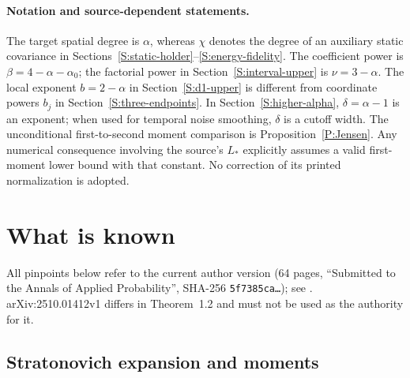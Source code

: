 \documentclass[12pt]{article}
\numberwithin{equation}{section}
\theoremstyle{definition}
\begin{document}
\paragraph{Notation and source-dependent statements.}
The target spatial degree is $\alpha$, whereas $\chi$ denotes the degree
of an auxiliary static covariance in
Sections~\ref{S:static-holder}--\ref{S:energy-fidelity}.
The coefficient power is $\beta=4-\alpha-\alpha_0$; the factorial power in
Section~\ref{S:interval-upper} is $\nu=3-\alpha$.
The local exponent $b=2-\alpha$ in Section~\ref{S:d1-upper} is different
from coordinate powers $b_j$ in Section~\ref{S:three-endpoints}.
In Section~\ref{S:higher-alpha}, $\delta=\alpha-1$ is an exponent;
when used for temporal noise smoothing, $\delta$ is a cutoff width.
The unconditional first-to-second moment comparison is
Proposition~\ref{P:Jensen}. Any numerical consequence involving the
source's $L_*$ explicitly assumes a valid first-moment lower bound with
that constant. No correction of its printed normalization is adopted.

\section{What is known}\label{S:known}

All pinpoints below refer to the current author version
\cite{chen:author2026:time-dependency} (64 pages, ``Submitted to the Annals
of Applied Probability'', SHA-256 \texttt{5f7385ca\dots}); see
. arXiv:2510.01412v1
\cite{chen:25:time-dependency} differs in Theorem~1.2 and must not be used as
the authority for it.

\subsection{Stratonovich expansion and moments}
\end{document}

